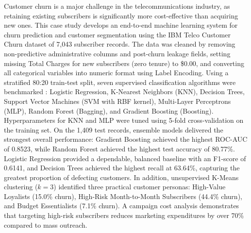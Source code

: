 \documentclass[12pt,oneside]{report}
\begin{document}
Customer churn is a major challenge in the telecommunications industry, as retaining existing subscribers is significantly more cost-effective than acquiring new ones. This case study develops an end-to-end machine learning system for churn prediction and customer segmentation using the IBM Telco Customer Churn dataset of 7,043 subscriber records. The data was cleaned by removing non-predictive administrative columns and post-churn leakage fields, setting missing Total Charges for new subscribers (zero tenure) to \$0.00, and converting all categorical variables into numeric format using Label Encoding. Using a stratified 80:20 train-test split, seven supervised classification algorithms were benchmarked : Logistic Regression, K-Nearest Neighbors (KNN), Decision Trees, Support Vector Machines (SVM with RBF kernel), Multi-Layer Perceptrons (MLP), Random Forest (Bagging), and Gradient Boosting (Boosting). Hyperparameters for KNN and MLP were tuned using 5-fold cross-validation on the training set. On the 1,409 test records, ensemble models delivered the strongest overall performance: Gradient Boosting achieved the highest ROC-AUC of 0.8523, while Random Forest achieved the highest test accuracy of 80.77\%. Logistic Regression provided a dependable, balanced baseline with an F1-score of 0.6141, and Decision Trees achieved the highest recall at 63.64\%, capturing the greatest proportion of defecting customers. In addition, unsupervised K-Means clustering ($k=3$) identified three practical customer personas: High-Value Loyalists (15.0\% churn), High-Risk Month-to-Month Subscribers (44.4\% churn), and Budget Essentialists (7.1\% churn). A campaign cost analysis demonstrates that targeting high-risk subscribers reduces marketing expenditures by over 70\% compared to mass outreach.
\clearpage
\end{document}
